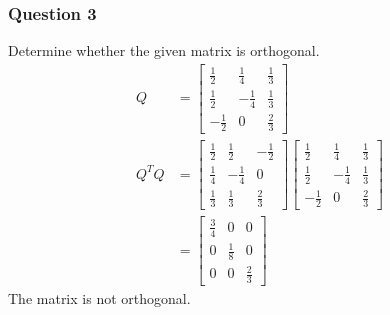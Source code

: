 \documentclass{math}
\begin{document}
\subsubsection*{Question 3}
Determine whether the given matrix is orthogonal.
\begin{align*}
  Q &= \begin{bmatrix}
    \frac{1}{2} & \frac{1}{4} & \frac{1}{3} \\
    \frac{1}{2} & -\frac{1}{4} & \frac{1}{3} \\
    -\frac{1}{2} & 0 & \frac{2}{3}
  \end{bmatrix} \\
  Q^TQ &= \begin{bmatrix}
    \frac{1}{2} & \frac{1}{2} & -\frac{1}{2} \\
    \frac{1}{4} & -\frac{1}{4} & 0 \\
    \frac{1}{3} & \frac{1}{3} & \frac{2}{3}
  \end{bmatrix}\begin{bmatrix}
    \frac{1}{2} & \frac{1}{4} & \frac{1}{3} \\
    \frac{1}{2} & -\frac{1}{4} & \frac{1}{3} \\
    -\frac{1}{2} & 0 & \frac{2}{3}
  \end{bmatrix} \\
  &= \begin{bmatrix}
    \frac{3}{4} & 0 & 0 \\
    0 & \frac{1}{8} & 0 \\
    0 & 0 & \frac{2}{3}
  \end{bmatrix}
\end{align*}
The matrix is not orthogonal.
\end{document}
